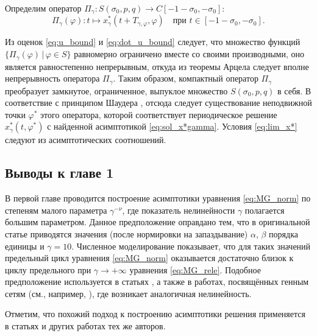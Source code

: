 Определим оператор $\Pi_{\gamma}: S(\sigma_0, p, q) \to C[-1-\sigma_0, -\sigma_0]$:
\begin{equation}
	\Pi_{\gamma}(\varphi): t \mapsto x^*_{\gamma}(t + T_{\gamma, \varphi}, \varphi) \quad \text{при } t \in [- 1 -\sigma_0, -\sigma_0].
\end{equation}

Из оценок \eqref{eq:u_bound} и \eqref{eq:dot_u_bound} следует, что множество функций $\{\Pi_{\gamma}(\varphi)\, | \, \varphi \in S\}$ равномерно ограничено вместе со своими производными, оно является равностепенно непрерывным, откуда из теоремы Арцела следует вполне непрерывность оператора $\Pi_{\gamma}$. Таким образом, компактный оператор $\Pi_{\gamma}$ преобразует замкнутое, ограниченное, выпуклое множество $S(\sigma_0, p, q)$ в себя. В соответствие с принципом Шаудера \cite{Krasnov1975}, отсюда следует существование неподвижной точки $\varphi^*$ этого оператора, которой соответствует периодическое решение $x^*_\gamma(t, \varphi^*)$ с найденной асимптотикой \eqref{eq:sol_x*gamma}. Условия \eqref{eq:lim_x*} следуют из асимптотических соотношений.

\subsection{Выводы к главе 1}

В первой главе проводится построение асимптотики уравнения \eqref{eq:MG_norm} по степеням малого параметра $\gamma^{-\nu}$, где показатель нелинейности $\gamma$ полагается большим параметром. Данное предположение оправдано тем, что в оригинальной статье \cite{Mackey1977} приводятся значения (после нормировки на запаздывание) $\alpha$, $\beta$ порядка единицы и $\gamma = 10$. Численное моделирование показывает, что для таких значений предельный цикл уравнения \eqref{eq:MG_norm} оказывается достаточно близок к циклу предельного при $\gamma \to +\infty$ уравнения \eqref{eq:MG_rele}. Подобное предположение используется в статьях \cite{Bartha2021, Krisztin2020}, а также в работах, посвящённых генным сетям (см., например, \cite{Volokitin2004}), где возникает аналогичная нелинейность.

Отметим, что похожий подход к построению асимптотики решения применяется в статьях \cite{Kolesov2010, Kolesov1997, Glyzin2013} и других работах тех же авторов.


